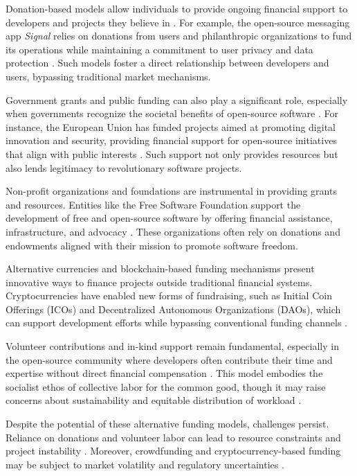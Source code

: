 \begin{refsection}
Donation-based models allow individuals to provide ongoing financial support to developers and projects they believe in \cite[pp.~102-105]{Freedman2013}. For example, the open-source messaging app \textit{Signal} relies on donations from users and philanthropic organizations to fund its operations while maintaining a commitment to user privacy and data protection \cite[pp.~66-68]{Marlinspike2018}. Such models foster a direct relationship between developers and users, bypassing traditional market mechanisms.

Government grants and public funding can also play a significant role, especially when governments recognize the societal benefits of open-source software \cite[pp.~136-138]{Weber2004}. For instance, the European Union has funded projects aimed at promoting digital innovation and security, providing financial support for open-source initiatives that align with public interests \cite{EuropeanCommission2017}. Such support not only provides resources but also lends legitimacy to revolutionary software projects.

Non-profit organizations and foundations are instrumental in providing grants and resources. Entities like the Free Software Foundation support the development of free and open-source software by offering financial assistance, infrastructure, and advocacy \cite[pp.~57-59]{Stallman2010}. These organizations often rely on donations and endowments aligned with their mission to promote software freedom.

Alternative currencies and blockchain-based funding mechanisms present innovative ways to finance projects outside traditional financial systems. Cryptocurrencies have enabled new forms of fundraising, such as Initial Coin Offerings (ICOs) and Decentralized Autonomous Organizations (DAOs), which can support development efforts while bypassing conventional funding channels \cite[pp.~150-152]{Swan2015}.

Volunteer contributions and in-kind support remain fundamental, especially in the open-source community where developers often contribute their time and expertise without direct financial compensation \cite[pp.~200-202]{Raymond2001}. This model embodies the socialist ethos of collective labor for the common good, though it may raise concerns about sustainability and equitable distribution of workload \cite[pp.~95-98]{Coleman2013}.

Despite the potential of these alternative funding models, challenges persist. Reliance on donations and volunteer labor can lead to resource constraints and project instability \cite[pp.~66-68]{Eghbal2020}. Moreover, crowdfunding and cryptocurrency-based funding may be subject to market volatility and regulatory uncertainties \cite[pp.~85-88]{DeFilippi2018}.


\end{refsection}
